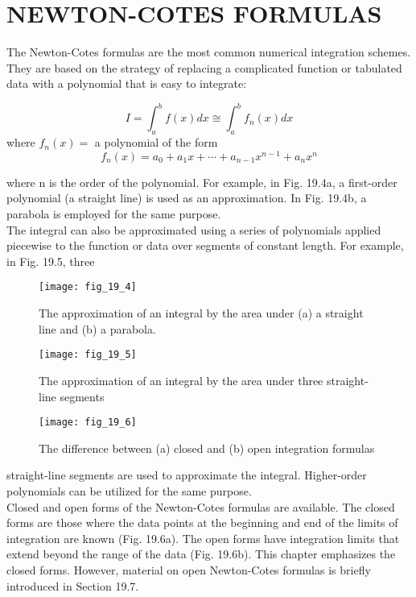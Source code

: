 \documentclass[../main.tex]{subfiles}
\begin{document}
		\section{NEWTON-COTES FORMULAS}
		The Newton-Cotes formulas are the most common numerical integration schemes. They
		are based on the strategy of replacing a complicated function or tabulated data with a polynomial that is easy to integrate:

		\begin{equation}
			\tag{19.8}
		I=\int_{a}^{b} f(x) d x \cong \int_{a}^{b} f_{n}(x) d x
	\end{equation}
		where $f_{n}(x)=$ a polynomial of the form
		\begin{equation}
			\tag{19.9}
		f_{n}(x)=a_{0}+a_{1} x+\cdots+a_{n-1} x^{n-1}+a_{n} x^{n}
	\end{equation}

	where n is the order of the polynomial. For example, in Fig. 19.4a, a first-order polynomial
	(a straight line) is used as an approximation. In Fig. 19.4b, a parabola is employed for the
	same purpose.\\
	The integral can also be approximated using a series of polynomials applied piecewise
	to the function or data over segments of constant length. For example, in Fig. 19.5, three

	\begin{figure}[H]
		\centering
		\texttt{[image: fig\_19\_4]}
	   \caption{\textsf{The approximation of an integral by the area under (a) a straight line and (b) a parabola.}}\label{fig:fig_19_4}
	\end{figure}
	\begin{figure}[H]
		\centering
		\texttt{[image: fig\_19\_5]}
	   \caption{\textsf{The approximation of an integral by the area under three straight-line segments}}\label{fig:fig_19_5}
	\end{figure}
	\begin{figure}[H]
		\centering
		\texttt{[image: fig\_19\_6]}
	   \caption{\textsf{The difference between (a) closed and (b) open integration formulas}}\label{fig:fig_19_6}
	\end{figure}

	straight-line segments are used to approximate the integral. Higher-order polynomials can
	be utilized for the same purpose.\\
	Closed and open forms of the Newton-Cotes formulas are available. The closed forms
are those where the data points at the beginning and end of the limits of integration are
known (Fig. 19.6a). The open forms have integration limits that extend beyond the range
of the data (Fig. 19.6b). This chapter emphasizes the closed forms. However, material on
open Newton-Cotes formulas is briefly introduced in Section 19.7.
\vspace{1cm}
\end{document}
